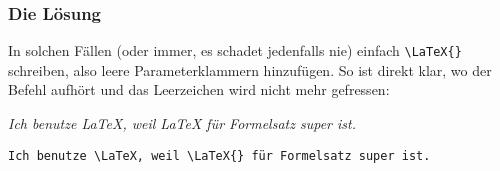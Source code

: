 			\subsubsection*{Die Lösung}
				In solchen Fällen (oder immer, es schadet jedenfalls nie) einfach \lstinline[language=thesis-latexbeispiel]|\LaTeX{}| schreiben, also leere Parameterklammern hinzufügen. So ist direkt klar, wo der Befehl aufhört und das Leerzeichen wird nicht mehr \glqq gefressen\grqq:
				\bigskip
				
				\emph{Ich benutze \LaTeX, weil \LaTeX{} für Formelsatz super ist.}
				\medskip
				
				\lstinline[language=thesis-latexbeispiel, showspaces=true]|Ich benutze \LaTeX, weil \LaTeX{} für Formelsatz super ist.|